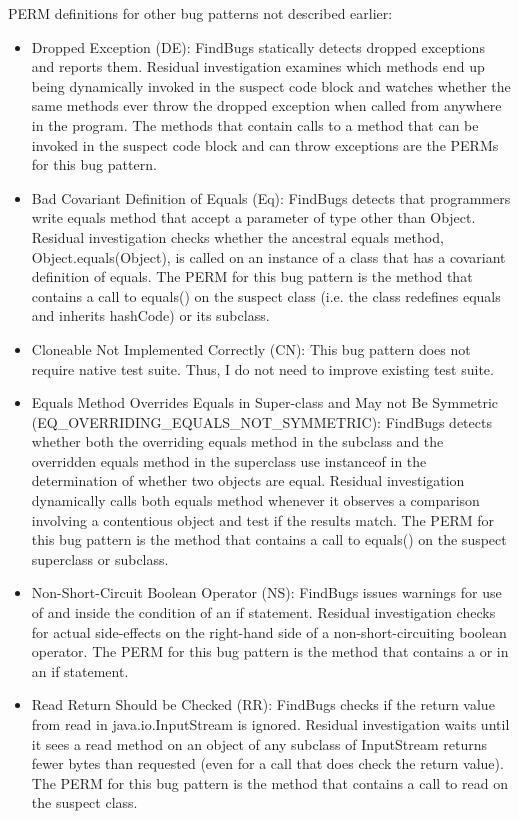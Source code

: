 PERM definitions for other bug patterns not described earlier:
\begin{itemize}
\item Dropped Exception (DE): FindBugs statically detects dropped exceptions and reports them.  Residual investigation examines which methods end up being dynamically invoked in the suspect code block and watches whether the same methods ever throw the dropped exception when called from anywhere in the program. The methods that contain calls to a method that can be invoked in the suspect code block and can throw exceptions are the PERMs for this bug pattern. 
\item Bad Covariant Definition of Equals (Eq): FindBugs detects that programmers write equals method that accept a parameter of type other than Object.  Residual investigation checks whether the ancestral equals method, Object.equals(Object), is called on an instance of a class that has a covariant definition of equals.  The PERM for this bug pattern is the method that contains a call to equals() on the suspect class (i.e. the class redefines equals and inherits hashCode) or its subclass.
\item Cloneable Not Implemented Correctly (CN): This bug pattern does not require native test suite.  Thus, I do not need to improve existing test suite.
\item Equals Method Overrides Equals in Super-class and May not Be Symmetric 
(EQ\_OVERRIDING\_EQUALS\_NOT\_SYMMETRIC): FindBugs detects whether both the overriding equals method in the subclass and the overridden equals method in the superclass use instanceof in the determination of whether two objects are equal.  Residual investigation dynamically calls both equals method whenever it observes a comparison involving a contentious object and test if the results match.  The PERM for this bug pattern is the method that contains a call to equals() on the suspect superclass or subclass.
\item Non-Short-Circuit Boolean Operator (NS): FindBugs issues warnings for use of \sv{\&} and \sv{|} inside the condition of an if statement.  Residual investigation checks for actual side-effects on the right-hand side of a non-short-circuiting boolean operator.  The PERM for this bug pattern is the method that contains a \sv{\&} or \sv{|} in an if statement.
\item Read Return Should be Checked (RR): FindBugs checks if the return value from read in java.io.InputStream is ignored.  Residual investigation waits until it sees a read method on an object of any subclass of InputStream returns fewer bytes than requested (even for a call that does check the return value).  The PERM for this bug pattern is the method that contains a call to read on the suspect class.
\end{itemize}

